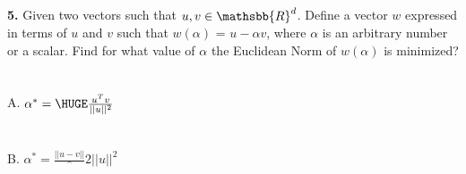 \documentclass[prl,twocolumn,showpacs,preprintnumbers,superscriptaddress]{revtex4}
\theoremstyle{plain}
\theoremstyle{definition}
\begin{document}
\begin{widetext}
\\
\\
\\
\\
\noindent\textbf{5.} Given two vectors such that $u, v \in \mathsbb{R}^d$. Define a vector $w$ expressed in terms of $u$ and $v$ such that $w(\alpha)$ = $u - \alpha v$, where $\alpha$ is an arbitrary number or a scalar. 
Find for what value of $\alpha$ the Euclidean Norm of $w(\alpha)$ is minimized? 
\\
\\
\\
A. $\alpha^* = {\HUGE \frac{u^Tv}{||u||^2}}$
\\
\\
\\
B. $\alpha^* = {\frac{||u - v||}^2{||u||^2}}$

\end{widetext}
\end{document}
